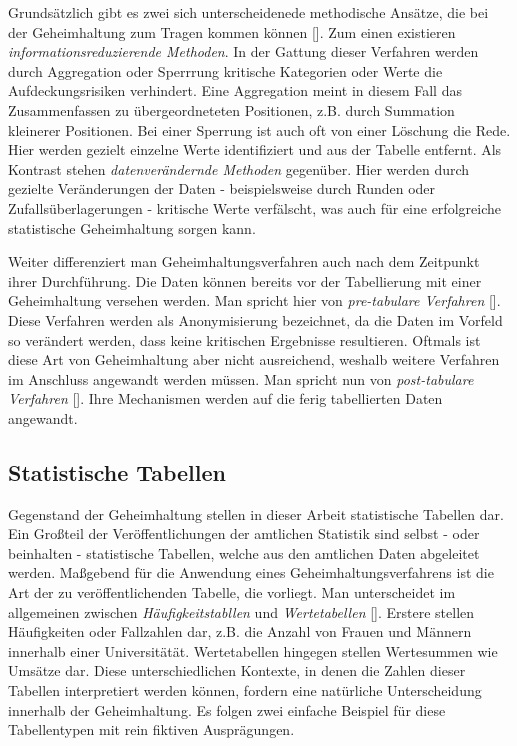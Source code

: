 Grundsätzlich gibt es zwei sich unterscheidenede methodische Ansätze, die bei der Geheimhaltung zum Tragen kommen können [\cite{Nickl}]. Zum einen existieren \textit{informationsreduzierende Methoden}. In der Gattung dieser Verfahren werden durch Aggregation oder Sperrrung kritische Kategorien oder Werte die Aufdeckungsrisiken verhindert. Eine Aggregation meint in diesem Fall das Zusammenfassen zu übergeordneteten Positionen, z.B. durch Summation kleinerer Positionen. Bei einer Sperrung ist auch oft von einer Löschung die Rede. Hier werden gezielt einzelne Werte identifiziert und aus der Tabelle entfernt. Als Kontrast stehen \textit{datenverändernde Methoden} gegenüber. Hier werden durch gezielte Veränderungen der Daten - beispielsweise durch Runden oder Zufallsüberlagerungen - kritische Werte verfälscht, was auch für eine erfolgreiche statistische Geheimhaltung sorgen kann. 

Weiter differenziert man Geheimhaltungsverfahren auch nach dem Zeitpunkt ihrer Durchführung. Die Daten können bereits vor der Tabellierung mit einer Geheimhaltung versehen werden. Man spricht hier von \textit{pre-tabulare Verfahren} [\cite{Rothe-1}]. Diese Verfahren werden als Anonymisierung bezeichnet, da die Daten im Vorfeld so verändert werden, dass keine kritischen Ergebnisse resultieren. Oftmals ist diese Art von Geheimhaltung aber nicht ausreichend, weshalb weitere Verfahren im Anschluss angewandt werden müssen. Man spricht nun von \textit{post-tabulare Verfahren} [\cite{Rothe-1}]. Ihre Mechanismen werden auf die ferig tabellierten Daten angewandt.


\subsection{Statistische Tabellen}

Gegenstand der Geheimhaltung stellen in dieser Arbeit statistische Tabellen dar. Ein Gro\ss teil der Veröffentlichungen der amtlichen Statistik sind selbst - oder beinhalten - statistische Tabellen, welche aus den amtlichen Daten abgeleitet werden. Ma\ss gebend für die Anwendung eines Geheimhaltungsverfahrens ist die Art der zu veröffentlichenden Tabelle, die vorliegt. Man unterscheidet im allgemeinen zwischen \textit{Häufigkeitstabllen} und \textit{Wertetabellen} [\cite{Nickl}]. Erstere stellen Häufigkeiten oder Fallzahlen dar, z.B. die Anzahl von Frauen und Männern innerhalb einer Universitätät. Wertetabellen hingegen stellen Wertesummen wie Umsätze dar. Diese unterschiedlichen Kontexte, in denen die Zahlen dieser Tabellen interpretiert werden können, fordern eine natürliche Unterscheidung innerhalb der Geheimhaltung. Es folgen zwei einfache Beispiel für diese Tabellentypen mit rein fiktiven Ausprägungen.

